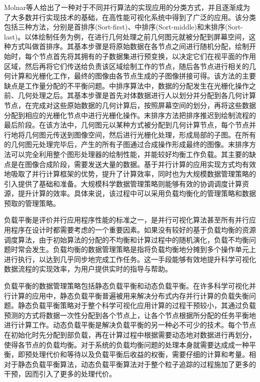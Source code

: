 Molnar等人\parencite{molnar1994a}给出了一种对于不同并行算法的实现应用的分类方式，并且逐渐成为了大多数并行实现技术的基础，在高性能可视化系统中得到了广泛的应用。该分类包括三种方法，分别是首排序(Sort-first)、中排序(Sort-middle)和末排序(Sort-last)。以体绘制任务为例，在进行几何处理之前几何图元就被分配到屏幕空间，这种方式叫做首排序。其基本步骤是将原始数据在各节点之间进行随机分配，绘制开始时，每个节点首先将其拥有的子数据集进行预变换，以决定它们在视平面的作用区域，然后再将它们传送给负责该区域绘制工作的节点，随后各节点进行相关的几何计算和光栅化工作，最终的图像由各节点生成的子图像拼接可得。该方法的主要缺点是工作量分配的不平衡问题。中排序算法中，数据的分配发生在光栅化操作之前、几何处理之后。其基本步骤是首先对体数据进行人以划分并分配到各几何计算节点，在完成对这些原始数据的几何计算后，按照屏幕空间的划分，再将这些数据分配到相应的光栅化节点中进行光栅化操作。末排序方法把排序推迟到绘制流程的最后阶段。在该方法中，几何图元以某种方式被分配到几何计算节点，每个节点并行地将几何图元传送到图像空间，然后进行光栅化处理，形成局部的子图。在所有的几何图元处理完毕后，产生的所有子图通过合成操作形成最终的图像。末排序方法可以完全利用整个图形处理器的绘制性能，并能较好均衡工作负载。其主要的缺点是在图像合成阶段，需要发送大量的数据。基于并行计算的应用实现方式均有效地吸取了并行计算框架的优势，提升了计算效率，同时也为大规模数据管理策略的引入提供了基础和准备。大规模科学数据管理策略则能够有效的协调调度计算资源，提升计算的效率。具体来说，该过程中可以采用负载均衡化的管理策略和数据预取的管理策略。

负载平衡是评价并行应用程序性能的标准之一，是并行可视化算法甚至所有并行应用程序在设计时都需要考虑的一个重要因素。如果没有较好的基于负载均衡的资源调度算法，由于初始算法的分配的不均衡和计算过程中的随机演化，负载不均衡问题时常会发生。负载均衡的数据管理策略是指将负载均衡地分摊到多个操作单元上进行执行，以达到几乎同步地完成工作任务。这一手段能够有效地提升科学可视化数据流程的实现效率，为用户提供实时的指导与帮助。

负载平衡的数据管理策略包括静态负载平衡和动态负载平衡。在许多科学可视化并行计算的应用中，静态负载平衡普遍被用来解决分布式内存并行计算的负载失衡问题。静态负载平衡策略对于整个科学可视化应用计算的过程干预较小，其通过负载预测的方式将数据一次性分配到各个节点上，让各个节点根据所分配的任务平衡地进行计算工作。动态负载平衡是解决负载平衡的另一种必不可少的技术。每个节点在初始化时先分配到部负载，再在计算过程中根据需要动态地对数据进行再划分，使得各节点的负载均衡。对于系统的负载均衡问题的处理本身就需要达成成一种平衡，即预处理代价和等待以及负载平衡后收益的权衡，需要仔细的计算和考量。相对于静态负载平衡算法，动态负载平衡算法对于整个粒子追踪的过程施加了更多的干预，因而引入了更多的处理代价。

